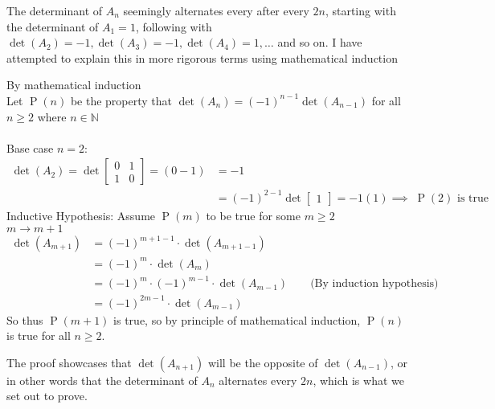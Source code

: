 \documentclass{report}
\begin{document}
\sol The determinant of $A_n$ seemingly alternates every after every $2n$, starting with the determinant of $A_1=1$, following with $\operatorname{det}(A_2) = -1, \operatorname{det}(A_3) = -1, \operatorname{det}(A_4) = 1,\ldots$ and so on. I have attempted to explain this in more rigorous terms using mathematical induction
\begin{myproof} By mathematical induction \\
Let $\operatorname{P}(n)$ be the property that $\operatorname{det}(A_n)=(-1)^{n-1}\operatorname{det}(A_{n-1})$ for all $n\ge2$ where $n\in\mathbb{N}$ \\
\\
\noindent Base case $n=2$: \\
\[
\begin{aligned}
\operatorname{det}(A_2) = \operatorname{det}\begin{bmatrix} 0 & 1 \\ 1 & 0 \end{bmatrix} = (0-1) & = -1 \\
& = (-1)^{2-1}\operatorname{det}\begin{bmatrix}1\end{bmatrix} = -1(1) \implies \;\operatorname{P}(2)\text{ is true}
\end{aligned}
\]
Inductive Hypothesis: Assume $\operatorname{P}(m)$ to be true for some $m\ge2$ \\
$m \rightarrow m+1$ \\
$$
\begin{aligned}
\operatorname{det}(A_{m+1}) & = (-1)^{m+1-1}\cdot\operatorname{det}(A_{m+1-1}) \\
& = (-1)^m \cdot \operatorname{det}(A_m) \\
& = (-1)^m \cdot (-1)^{m-1} \cdot \operatorname{det}(A_{m-1}) \qquad\text{(By induction hypothesis)} \\
& = (-1)^{2m-1}\cdot\operatorname{det}(A_{m-1})
\end{aligned}
$$
So thus $\operatorname{P}(m+1)$ is true, so by principle of mathematical induction, $\operatorname{P}(n)$ is true for all $n\ge2$.
\end{myproof}
\noindent The proof showcases that $\operatorname{det}(A_{n+1})$ will be the opposite of $\operatorname{det}(A_{n-1})$, or in other words that the determinant of $A_n$ alternates every $2n$, which is what we set out to prove.
\end{document}
